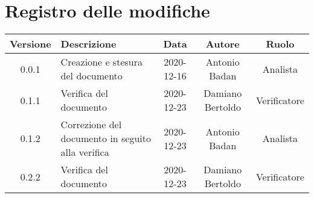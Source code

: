 \section*{Registro delle modifiche}

\begin{center}
	\begin{longtable}{|c|p{5cm}|c|c|c|}
	\hline
	\rowcolor{lighter-grayer}
	\textbf{Versione} & \textbf{Descrizione} & \textbf{Data} & \textbf{Autore} & \textbf{Ruolo} \\
	\hline
	\endfirsthead


	\hline
	0.0.1 & Creazione e stesura del documento & 2020-12-16 & Antonio Badan & Analista \\
	\hline
	0.1.1 & Verifica del documento & 2020-12-23 & Damiano Bertoldo & Verificatore \\
	\hline
	0.1.2 & Correzione del documento in seguito alla verifica & 2020-12-23 & Antonio Badan & Analista \\
	\hline
	0.2.2 & Verifica del documento & 2020-12-23 & Damiano Bertoldo & Verificatore \\
	\hline

	\end{longtable}
\end{center}